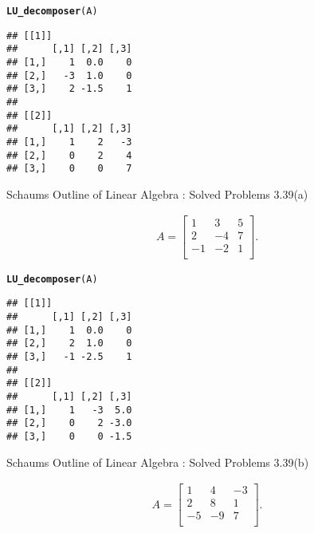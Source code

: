 \documentclass[11pt, a4paper]{article}\usepackage[]{graphicx}\usepackage[]{xcolor}
\makeatletter
\newcommand{\hldef}[1]{\textcolor[rgb]{0.345,0.345,0.345}{#1}}%
\newcommand{\hlkwd}[1]{\textcolor[rgb]{0.737,0.353,0.396}{\textbf{#1}}}%
\newenvironment{kframe}{%
 \def\at@end@of@kframe{}%
 \ifinner\ifhmode%
  \def\at@end@of@kframe{\end{minipage}}%
  \begin{minipage}{\columnwidth}%
 \fi\fi%
 \def\FrameCommand##1{\hskip\@totalleftmargin \hskip-\fboxsep
 \colorbox{shadecolor}{##1}\hskip-\fboxsep
     \hskip-\linewidth \hskip-\@totalleftmargin \hskip\columnwidth}%
 \MakeFramed {\advance\hsize-\width
   \@totalleftmargin\z@ \linewidth\hsize
   \@setminipage}}%
 {\par\unskip\endMakeFramed%
 \at@end@of@kframe}
\newenvironment{knitrout}{}{} %
\makeatother
\begin{document}
\begin{knitrout}
\color{fgcolor}\begin{kframe}
\begin{alltt}
\hlkwd{LU_decomposer}\hldef{(A)}
\end{alltt}
\begin{verbatim}
## [[1]]
##      [,1] [,2] [,3]
## [1,]    1  0.0    0
## [2,]   -3  1.0    0
## [3,]    2 -1.5    1
## 
## [[2]]
##      [,1] [,2] [,3]
## [1,]    1    2   -3
## [2,]    0    2    4
## [3,]    0    0    7
\end{verbatim}
\end{kframe}
\end{knitrout}

\leftpointright \hspace{0.2cm} Schaums Outline of Linear Algebra : Solved Problems 3.39(a)

\begin{gather*}
A = 
\begin{bmatrix}
1 & 3 & 5 \\
2 & -4 & 7 \\
-1 & -2 & 1 \\
\end{bmatrix}.
\end{gather*}



\begin{knitrout}
\color{fgcolor}\begin{kframe}
\begin{alltt}
\hlkwd{LU_decomposer}\hldef{(A)}
\end{alltt}
\begin{verbatim}
## [[1]]
##      [,1] [,2] [,3]
## [1,]    1  0.0    0
## [2,]    2  1.0    0
## [3,]   -1 -2.5    1
## 
## [[2]]
##      [,1] [,2] [,3]
## [1,]    1   -3  5.0
## [2,]    0    2 -3.0
## [3,]    0    0 -1.5
\end{verbatim}
\end{kframe}
\end{knitrout}


\newpage

\leftpointright \hspace{0.2cm} Schaums Outline of Linear Algebra : Solved Problems 3.39(b)

\begin{gather*}
A = 
\begin{bmatrix}
1 & 4 & -3 \\
2 & 8 & 1 \\
-5 & -9 & 7 \\
\end{bmatrix}.
\end{gather*}
\end{document}
